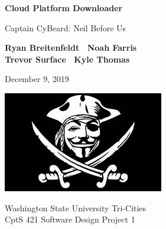 \documentclass{article}
\begin{document}

    \begin{titlepage}
        \begin{center}
            \vspace*{1cm}
    
            \Huge
            \textbf{Cloud Platform Downloader}
    
            \vspace{.5cm}
            \LARGE
            Captain CyBeard: Neil Before Us
    
            \vspace{1cm}
    
            \textbf{Ryan Breitenfeldt \textbar\ Noah Farris\\ Trevor Surface \textbar\ Kyle Thomas}
    
            \vspace{.2cm}
            \Large
            December 9, 2019
    
            \vspace{2cm}
            \includegraphics[scale=1]{logo}
    
            \vfill
    
            Washington State University Tri-Cities\\
            CptS 421 Software Design Project 1
    
        \end{center}
    \end{titlepage}
\end{document}

